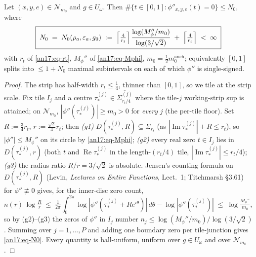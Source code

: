 \begin{lemma}\label{an17:lem-jensen}
Let $(x,y,e)\in\mathcal N_{m_0}$ and $g\in U_\omega$. Then $\#\{t\in[0,1]:
\phi''_{x,y,e}(t)=0\}\le N_0$, where
\begin{equation}\label{an17:eq-N0}
 \boxed{\;N_0\;=\;N_0(\rho_a,\varepsilon_a,g_0)\;:=\;\Bigl\lceil\tfrac4{r_t}
 \Bigr\rceil\,\frac{\log(M_\phi''/m_0)}{\log(3/\sqrt2)}\;+\;\Bigl\lceil\tfrac4
 {r_t}\Bigr\rceil\;<\;\infty\;}
\end{equation}
with $r_t$ of \eqref{an17:eq-rt}, $M_\phi''$ of \eqref{an17:eq-Mphi}, $m_0=\tfrac12
m_0^{\mathrm{anch}}$; equivalently $[0,1]$ splits into $\le1+N_0$ maximal
subintervals on each of which $\phi''$ is single-signed.
\end{lemma}
\begin{proof}
The strip has half-width $r_t\le\tfrac14$, thinner than $[0,1]$, so we tile at the
strip scale. Fix tile $I_j$ and a centre $\tau_*^{(j)}\in\overline{\Sigma_{r_t/4}
^{(j)}}$ where the tile-$j$ working-strip sup is attained; on $\mathcal N_{m_0}$,
$|\phi''(\tau_*^{(j)})|\ge m_0>0$ for \emph{every} $j$ (the per-tile floor). Set
$R:=\tfrac34 r_t$, $r:=\tfrac{\sqrt2}4 r_t$; then \emph{(g1)} $D(\tau_*^{(j)},R)
\subseteq\Sigma_{r_t}$ (as $|\operatorname{Im}\tau_*^{(j)}|+R\le r_t$), so
$|\phi''|\le M_\phi''$ on its circle by \eqref{an17:eq-Mphi}; \emph{(g2)} every
real zero $t\in I_j$ lies in $D(\tau_*^{(j)},r)$ (both $t$ and
$\operatorname{Re}\tau_*^{(j)}$ in the length-$(r_t/4)$ tile, $|\operatorname{Im}
\tau_*^{(j)}|\le r_t/4$); \emph{(g3)} the radius ratio $R/r=3/\sqrt2$ is absolute.
Jensen's counting formula on $D(\tau_*^{(j)},R)$ (Levin, \emph{Lectures on Entire
Functions}, Lect.~1; Titchmarsh \S3.61) for $\phi''\not\equiv0$ gives, for the
inner-disc zero count,
\begin{equation}\label{an17:eq-jensenrow}
 n(r)\,\log\tfrac Rr\;\le\;\tfrac1{2\pi}\!\int_0^{2\pi}\!\log|\phi''(\tau_*^{(j)}
 +Re^{i\theta})|\,d\theta-\log|\phi''(\tau_*^{(j)})|\;\le\;\log\tfrac{M_\phi''}
 {m_0},
\end{equation}
so by (g2)--(g3) the zeros of $\phi''$ in $I_j$ number $n_j\le\log(M_\phi''/m_0)/
\log(3/\sqrt2)$. Summing over $j=1,\dots,P$ and adding one boundary zero per
tile-junction gives \eqref{an17:eq-N0}. Every quantity is ball-uniform, uniform
over $g\in U_\omega$ and over $\mathcal N_{m_0}$.
\end{proof}

